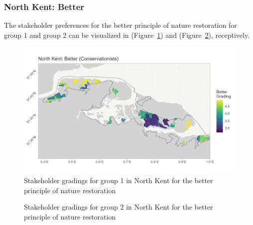 \documentclass[
  12pt,
  letterpaper,
  DIV=11,
  numbers=noendperiod]{scrartcl}
\begin{document}
\newpage{}

\subsubsection{North Kent: Better}\label{north-kent-better}

The stakeholder preferences for the better principle of nature
restoration for group 1 and group 2 can be visualized in
(Figure~\ref{fig-NKBetterG1}) and (Figure~\ref{fig-NKBetterG2}),
receptively.

\begin{figure}[H]

\includegraphics[width=7.29167in,height=\textheight]{Plots/NorthKent_G1_Better.png}

\caption{\label{fig-NKBetterG1}Stakeholder gradings for group 1 in North
Kent for the better principle of nature restoration}

\end{figure}%

\begin{figure}[H]


\caption{\label{fig-NKBetterG2}Stakeholder gradings for group 2 in North
Kent for the better principle of nature restoration}

\end{figure}%
\end{document}
